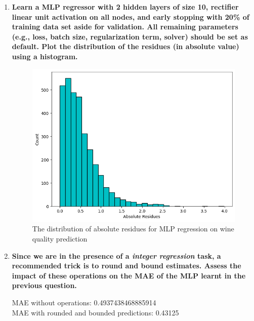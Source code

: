 \documentclass[12pt]{article}
\begin{document}
\begin{enumerate}[leftmargin=\labelsep]
    \item \textbf{Learn a MLP regressor with 2 hidden layers of size 10, rectifier linear unit activation
          on all nodes, and early stopping with 20\% of training data set aside for validation. All
          remaining parameters (e.g., loss, batch size, regularization term, solver) should be set as
          default. Plot the distribution of the residues (in absolute value) using a histogram.}

          \vskip 0.3cm
          

          \begin{figure}[H]
              \centering
              \includegraphics[width=14cm]{./assets/residues_histogram_ex1_PartII.png}
              \caption{The distribution of absolute residues for MLP regression on wine quality prediction}
              \label{fig:PartII-ex1}
          \end{figure}

    \item \textbf{Since we are in the presence of a \textit{integer regression} task, a recommended trick is to
          round and bound estimates. Assess the impact of these operations on the MAE of the MLP learnt in the previous question.}

          \vskip 0.3cm
          

          MAE without operations: 0.4937438468885914        \\
          MAE with rounded and bounded predictions: 0.43125 \\


\end{enumerate}
\end{document}

